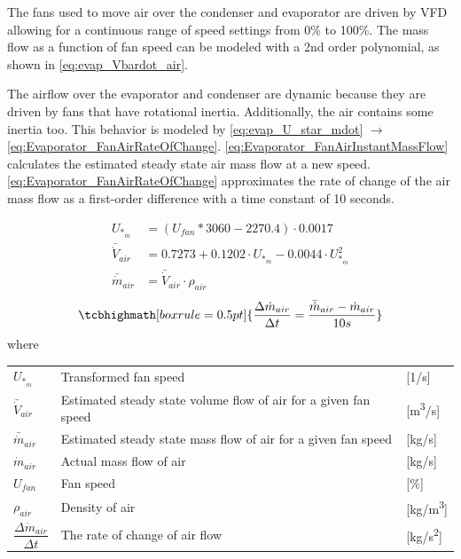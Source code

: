 The fans used to move air over the condenser and evaporator are driven by VFD allowing for a continuous range of speed settings from 0\% to 100\%. The mass flow as a function of fan speed can be modeled with a 2nd order polynomial, as shown in \cref{eq:evap_Vbardot_air}.

The airflow over the evaporator and condenser are dynamic because they are driven by fans that have rotational inertia. Additionally, the air contains some inertia too. This behavior is modeled by \cref{eq:evap_U_star_mdot} $\rightarrow$ \cref{eq:Evaporator_FanAirRateOfChange}. \cref{eq:Evaporator_FanAirInstantMassFlow} calculates the estimated steady state air mass flow at a new speed. \cref{eq:Evaporator_FanAirRateOfChange} approximates the rate of change of the air mass flow as a first-order difference with a time constant of 10 seconds.

\begin{align}
	U_{*_{\dot{m}}} & = (U_{fan}*3060 - 2270.4)\cdot 0.0017 \label{eq:evap_U_star_mdot}\\
	\bar{\dot{V}}_{air} & = 0.7273 + 0.1202 \cdot 	U_{*_{\dot{m}}}  -0.0044 \cdot 	U_{*_{\dot{m}}}^2	\label{eq:evap_Vbardot_air} \\
	\bar{\dot{m}}_{air} & = \bar{\dot{V}}_{air} \cdot \rho_{air}	\label{eq:Evaporator_FanAirInstantMassFlow}
\end{align}
\begin{equation}
	\tcbhighmath[boxrule = 0.5pt]{ 	\frac{\Delta \dot{m}_{air}}{\Delta t} = \frac{\bar{\dot{m}}_{air}  - \dot{m}_{air}}{10s}  }  \label{eq:Evaporator_FanAirRateOfChange}
\end{equation}
where

\begin{center}
	\begin{tabular}{l p{8cm} l}
		$ 	U_{*_{\dot{m}}} $ 						& Transformed fan speed												& [1/\si{s}]\\
		$\bar{\dot{V}}_{air}$						& Estimated steady state volume flow of air for a given fan speed 	& [\si{m^3}/\si{s}] \\
		$\bar{\dot{m}}_{air}$						& Estimated steady state mass flow of air for a given fan speed 	& [\si{kg}/\si{s}] \\
		$\dot{m}_{air}$								& Actual mass flow of air					  						& [\si{kg}/\si{s}] \\
		$U_{fan}$									& Fan speed 														& [$\%$] \\
		$\rho_{air}$								& Density of air													& [\si{kg}/\si{m^3}] \\[0.2cm]
		$\dfrac{\Delta \dot{m}_{air}}{\Delta t} $ 	& The rate of change of	air flow 									& [\si{kg}/\si{s^2}]
	\end{tabular}
\end{center}

